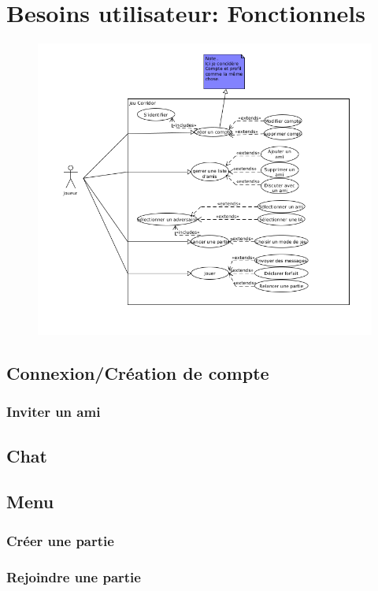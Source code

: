 \documentclass[utf8]{article}
\begin{document}
\section{Besoins utilisateur: Fonctionnels}

\begin{figure}[H]
  \centering
  \includegraphics[scale=0.6]{img/ClientUseCase.png}
\end{figure}

  \subsection{Connexion/Création de compte}
    \subsubsection{Inviter un ami}
  \subsection{Chat}
  \subsection{Menu}
    \subsubsection{Créer une partie}
    \subsubsection{Rejoindre une partie}
\end{document}

